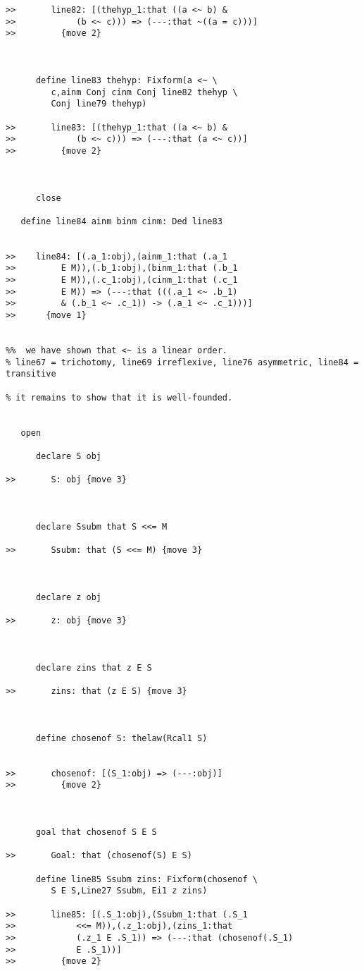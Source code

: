 \documentclass[12pt]{article}
\begin{document}
\begin{verbatim}
>>       line82: [(thehyp_1:that ((a <~ b) &
>>            (b <~ c))) => (---:that ~((a = c)))]
>>         {move 2}



      define line83 thehyp: Fixform(a <~ \
         c,ainm Conj cinm Conj line82 thehyp \
         Conj line79 thehyp)

>>       line83: [(thehyp_1:that ((a <~ b) &
>>            (b <~ c))) => (---:that (a <~ c))]
>>         {move 2}



      close

   define line84 ainm binm cinm: Ded line83


>>    line84: [(.a_1:obj),(ainm_1:that (.a_1
>>         E M)),(.b_1:obj),(binm_1:that (.b_1
>>         E M)),(.c_1:obj),(cinm_1:that (.c_1
>>         E M)) => (---:that (((.a_1 <~ .b_1)
>>         & (.b_1 <~ .c_1)) -> (.a_1 <~ .c_1)))]
>>      {move 1}


%%  we have shown that <~ is a linear order. 
% line67 = trichotomy, line69 irreflexive, line76 asymmetric, line84 = transitive

% it remains to show that it is well-founded.


   open

      declare S obj

>>       S: obj {move 3}



      declare Ssubm that S <<= M

>>       Ssubm: that (S <<= M) {move 3}



      declare z obj

>>       z: obj {move 3}



      declare zins that z E S

>>       zins: that (z E S) {move 3}



      define chosenof S: thelaw(Rcal1 S)


>>       chosenof: [(S_1:obj) => (---:obj)]
>>         {move 2}



      goal that chosenof S E S

>>       Goal: that (chosenof(S) E S)

      define line85 Ssubm zins: Fixform(chosenof \
         S E S,Line27 Ssubm, Ei1 z zins)

>>       line85: [(.S_1:obj),(Ssubm_1:that (.S_1
>>            <<= M)),(.z_1:obj),(zins_1:that
>>            (.z_1 E .S_1)) => (---:that (chosenof(.S_1)
>>            E .S_1))]
>>         {move 2}




\end{verbatim}
\end{document}
